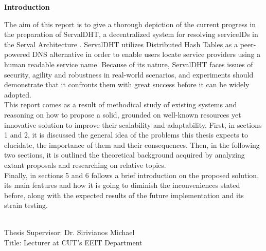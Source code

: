 \documentclass[12pt,a4paper,oneside]{article}
\begin{document}
{\Large \bf \noindent Introduction} \\[0.5cm]
The aim of this report is to give a thorough depiction of the current progress in the preparation of ServalDHT, a decentralized system for resolving serviceIDs in the Serval Architecture \cite{Nordstrom2012}. ServalDHT utilizes Distributed Hash Tables  as a peer-powered DNS   alternative in order to enable users locate service providers using a human readable service name. Because of its nature, ServalDHT faces issues of security, agility and robustness in real-world scenarios, and experiments should demonstrate that it confronts them with great success before it can be widely adopted.\\
\indent This report comes as a result of methodical study of existing systems and reasoning on how to propose a solid, grounded on well-known resources yet innovative solution to improve their scalability and adaptability. First, in sections 1 and 2, it is discussed the general idea of the problems this thesis expects to elucidate, the importance of them and their consequences. Then, in the following two sections, it is outlined the theoretical background acquired by analyzing extant proposals and researching on relative topics.\\
\indent Finally, in sections 5 and 6 follows a brief introduction on the proposed solution, its main features and how it is going to diminish the inconveniences stated before, along with the expected results of the future implementation and its strain testing.

~\\[0.5cm]
{\large
\noindent Thesis Supervisor: Dr. Sirivianos Michael\\
\noindent Title: Lecturer at CUT's EEIT Department}


\newpage
\end{document}

